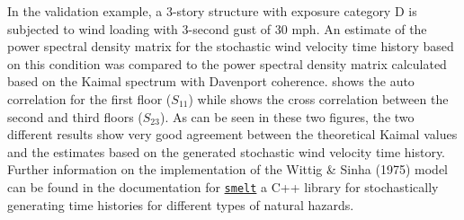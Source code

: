 In the validation example, a 3-story structure with exposure category
D is subjected to wind loading with 3-second gust of 30 mph. An
estimate of the power spectral density matrix for the stochastic wind
velocity time history based on this condition was compared to the
power spectral density matrix calculated based on the Kaimal spectrum
with Davenport coherence.  shows the auto correlation
for the first floor ($S_{11}$) while  shows the cross
correlation between the second and third floors ($S_{23}$). As can be seen in
these two figures, the two different results show very good agreement
between the theoretical Kaimal values and the estimates based on the
generated stochastic wind velocity time history. Further information
on the implementation of the Wittig \& Sinha (1975) model can be found
in the documentation
for \href{https://github.com/NHERI-SimCenter/smelt}{\texttt{smelt}}\textemdash
a C++ library for stochastically generating time histories for
different types of natural hazards.
